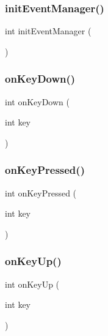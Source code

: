 \subsubsection{\texorpdfstring{init\+Event\+Manager()}{initEventManager()}}
{\footnotesize\ttfamily int init\+Event\+Manager (\begin{DoxyParamCaption}{ }\end{DoxyParamCaption})}

\mbox{\label{group___event_manager_ga3ce16bba2f2a79d18098dc5051f3ffe2}} 
\subsubsection{\texorpdfstring{on\+Key\+Down()}{onKeyDown()}}
{\footnotesize\ttfamily int on\+Key\+Down (\begin{DoxyParamCaption}\item[{int}]{key }\end{DoxyParamCaption})}

\mbox{\label{group___event_manager_gaef72f62038b36afa849c887d2b96115a}} 
\subsubsection{\texorpdfstring{on\+Key\+Pressed()}{onKeyPressed()}}
{\footnotesize\ttfamily int on\+Key\+Pressed (\begin{DoxyParamCaption}\item[{int}]{key }\end{DoxyParamCaption})}

\mbox{\label{group___event_manager_gaeed663775ba4ef9673bddbd1927a189b}} 
\subsubsection{\texorpdfstring{on\+Key\+Up()}{onKeyUp()}}
{\footnotesize\ttfamily int on\+Key\+Up (\begin{DoxyParamCaption}\item[{int}]{key }\end{DoxyParamCaption})}

